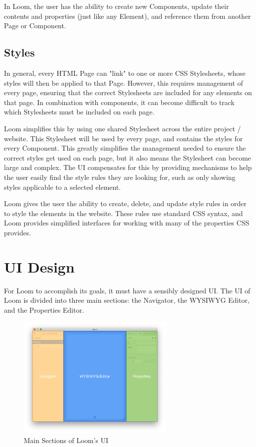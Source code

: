 \documentclass[conference, letterpaper]{IEEEtran}
\begin{document}
In Loom, the user has the ability to create new Components, update their contents and properties (just like any Element), and reference them from another Page or Component.

\subsection{Styles}
In general, every HTML Page can "link" to one or more CSS Stylesheets, whose styles will then be applied to that Page. However, this requires management of every page, ensuring that the correct Stylesheets are included for any elements on that page. In combination with components, it can become difficult to track which Stylesheets must be included on each page.

Loom simplifies this by using one shared Stylesheet across the entire project / website. This Stylesheet will be used by every page, and contains the styles for every Component. This greatly simplifies the management needed to ensure the correct styles get used on each page, but it also means the Stylesheet can become large and complex. The UI compensates for this by providing mechanisms to help the user easily find the style rules they are looking for, such as only showing styles applicable to a selected element.

Loom gives the user the ability to create, delete, and update style rules in order to style the elements in the website. These rules use standard CSS syntax, and Loom provides simplified interfaces for working with many of the properties CSS provides.

\section{UI Design}
For Loom to accomplish its goals, it must have a sensibly designed UI. The UI of Loom is divided into three main sections: the Navigator, the WYSIWYG Editor, and the Properties Editor.

\begin{figure}[!t]
  \centering
  \includegraphics[width=3in]{../ui_outline.png}
  \caption{Main Sections of Loom's UI}
  \label{fig:dataflow}
\end{figure}
\end{document}
